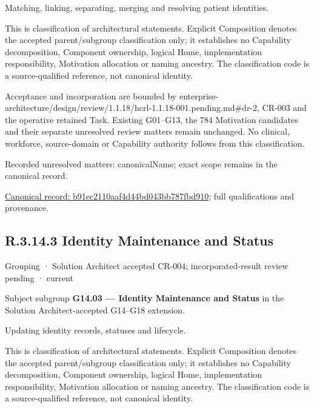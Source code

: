 Matching, linking, separating, merging and resolving patient identities.



This is classification of architectural statements. Explicit Composition denotes the accepted parent/subgroup classification only; it establishes no Capability decomposition, Component ownership, logical Home, implementation responsibility, Motivation allocation or naming ancestry. The classification code is a source-qualified reference, not canonical identity.



Acceptance and incorporation are bounded by enterprise-architecture/design/review/1.1.18/hcrl-1.1.18-001.pending.md\#dr-2, CR-003 and the operative retained Task. Existing G01–G13, the 784 Motivation candidates and their separate unresolved review matters remain unchanged. No clinical, workforce, source-domain or Capability authority follows from this classification.


{\small Recorded unresolved matters: canonicalName; exact scope remains in the canonical record.}\par
{\footnotesize \href{../../../../continuum/grouping/b91ec2110aaf4d44bd043bb787fbd910.md}{Canonical record: b91ec2110aaf4d44bd043bb787fbd910}; full qualifications and provenance.}\par
\subsection*{R.3.14.3 Identity Maintenance and Status}
\label{navigation:R.3.14.3}

\label{element:801386f27cda458b8ce811f133d917e9}
{\small Grouping · Solution Architect accepted CR-004; incorporated-result review pending · current}\par

Subject subgroup \textbf{G14.03 — Identity Maintenance and Status} in the Solution Architect-accepted G14–G18 extension.



Updating identity records, statuses and lifecycle.



This is classification of architectural statements. Explicit Composition denotes the accepted parent/subgroup classification only; it establishes no Capability decomposition, Component ownership, logical Home, implementation responsibility, Motivation allocation or naming ancestry. The classification code is a source-qualified reference, not canonical identity.




